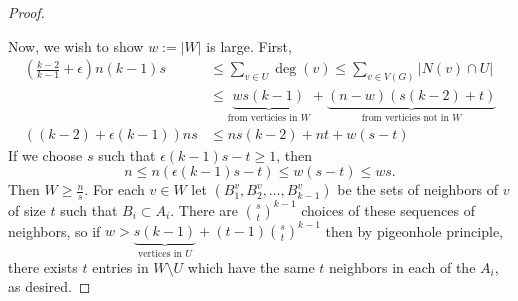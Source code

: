 \begin{proof}
\begin{figure}
\begin{center}
\end{center}
\end{figure}
Now, we wish to show $w:= |W|$ is large. First,
\begin{align*}	
\left( \frac{k-2}{k-1}+ \epsilon \right)n(k-1)s &\leq  \sum_{v\in U}\deg(v) \leq \sum_{v\in V(G)} |N(v)\cap U|\\
&\leq \underbrace{w s(k-1)}_{\text{from verticies in }W} + \underbrace{(n-w) (s(k-2)+t)}_{\text{from verticies not in }W}\\
((k-2) + \epsilon (k-1)) n s &\leq ns (k-2) + nt + w(s-t)
\end{align*}
If we choose $s$ such that $\epsilon (k-1) s -t \geq 1$, then
\[
n \leq n( \epsilon (k-1)s - t) \leq w (s-t) \leq ws.
\]
Then $W\geq \frac{n}{s}$. For each $v\in W$ let $(B_1^v,B_2^v,\dotsc,B_{k-1}^v)$ be the sets of neighbors of $v$ of size $t$ such that $B_i \subset A_i$. There are ${s \choose t}^{k-1}$ choices of these sequences of neighbors, so if $w > \underbrace{s(k-1)}_{\text{vertices in }U}+ (t-1) {s \choose t}^{k-1}$  then by pigeonhole principle, there exists $t$  entries in $W\setminus U$ which have the same $t$ neighbors in each of the $A_i$, as desired.\qedhere



\end{proof}
